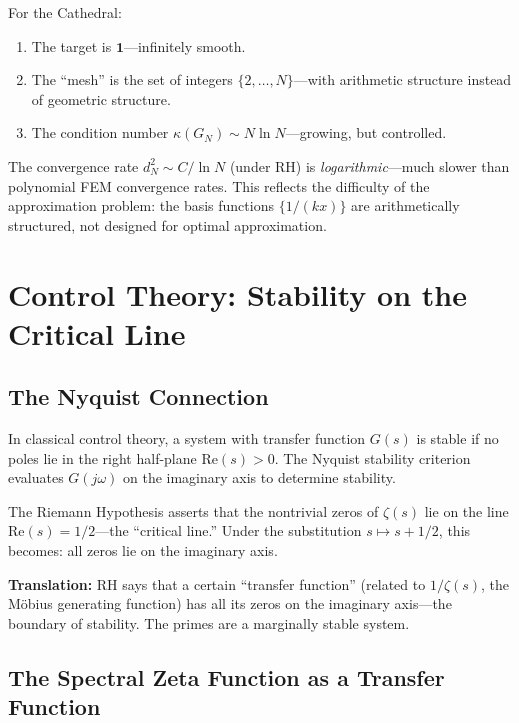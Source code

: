 \documentclass[11pt,a4paper]{article}
\newcommand{\RH}{\ensuremath{\mathrm{RH}}}
\begin{document}
For the Cathedral:
\begin{enumerate}
  \item The target is $\mathbf{1}$---infinitely smooth.
  \item The ``mesh'' is the set of integers $\{2, \ldots, N\}$---with
    arithmetic structure instead of geometric structure.
  \item The condition number $\kappa(G_N) \sim N \ln N$---growing,
    but controlled.
\end{enumerate}

The convergence rate $d_N^2 \sim C / \ln N$ (under \RH) is
\emph{logarithmic}---much slower than polynomial FEM convergence
rates. This reflects the difficulty of the approximation problem:
the basis functions $\{1/(kx)\}$ are arithmetically structured, not
designed for optimal approximation.

\section{Control Theory: Stability on the Critical Line}
\label{sec:control}

\subsection{The Nyquist Connection}

In classical control theory, a system with transfer function $G(s)$
is stable if no poles lie in the right half-plane $\mathrm{Re}(s) > 0$.
The Nyquist stability criterion evaluates $G(j\omega)$ on the
imaginary axis to determine stability.

The Riemann Hypothesis asserts that the nontrivial zeros of
$\zeta(s)$ lie on the line $\mathrm{Re}(s) = 1/2$---the ``critical
line.'' Under the substitution $s \mapsto s + 1/2$, this becomes:
all zeros lie on the imaginary axis.

\textbf{Translation:} \RH{} says that a certain ``transfer function''
(related to $1/\zeta(s)$, the M\"obius generating function) has all
its zeros on the imaginary axis---the boundary of stability. The
primes are a marginally stable system.

\subsection{The Spectral Zeta Function as a Transfer Function}
\end{document}
